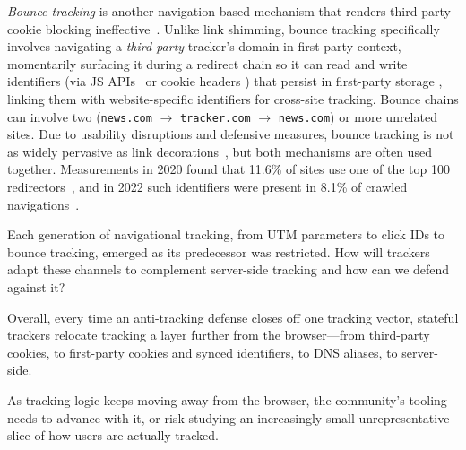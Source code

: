\textit{Bounce tracking} is another navigation-based mechanism that renders third-party cookie blocking ineffective~\cite{kellyBounceTrackingMitigations2022}.
%
Unlike link shimming, 
bounce tracking specifically involves navigating a \emph{third-party} tracker's domain in first-party context, momentarily surfacing it during a redirect chain so it can read and write identifiers (via JS APIs \symExecution\ or cookie headers \symSharing) that persist in first-party storage \symStorage, linking them with website-specific identifiers for cross-site tracking.
%
Bounce chains can involve two (\texttt{news.com} $\rightarrow$ \texttt{tracker.com} $\rightarrow$ \texttt{news.com}) or more unrelated sites.
%
Due to usability disruptions and defensive measures, bounce tracking is not as widely pervasive as link decorations~\cite{iqbalKhaleesiBreakerAdvertising2022}, but both mechanisms are often used together.
%
Measurements in 2020 found that 11.6\% of sites use one of the top 100 redirectors~\cite{koopInDepthEvaluationRedirect2020}, and in 2022 such identifiers were present in 8.1\% of crawled navigations~\cite{randallMeasuringUIDSmuggling2022}.


\begin{opbox}
Each generation of navigational tracking, from UTM parameters to click IDs to bounce tracking, emerged as its predecessor was restricted. How will trackers adapt these channels to complement server-side tracking and how can we defend against it?
\end{opbox}


\noindent Overall, every time an anti-tracking defense closes off one tracking vector, stateful trackers relocate tracking a layer further from the browser---from third-party cookies, to first-party cookies and synced identifiers, to DNS aliases, to server-side.

\begin{opbox}
As tracking logic keeps moving away from the browser, the community's tooling
needs to advance with it, or risk studying an increasingly small unrepresentative slice of how users are actually tracked.
\end{opbox}


